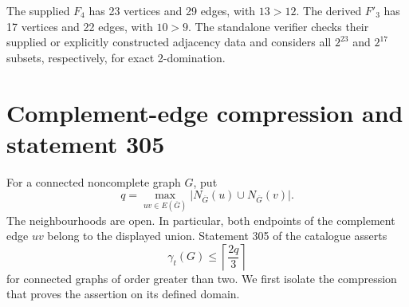 \documentclass[11pt,a4paper]{article}
\theoremstyle{remark}
\begin{document}
The supplied $F_4$ has 23 vertices and 29 edges, with $13>12$.
The derived $F'_3$ has 17 vertices and 22 edges, with $10>9$.
The standalone verifier checks their supplied or explicitly constructed
adjacency data and considers all $2^{23}$ and $2^{17}$ subsets,
respectively, for exact 2-domination.

\section{Complement-edge compression and statement 305}
\label{r5:sec305}

For a connected noncomplete graph \(G\), put
\[
q=\max_{uv\in E(\overline G)}
   \bigl|N_{\overline G}(u)\cup N_{\overline G}(v)\bigr|.
\]
The neighbourhoods are open. In particular, both endpoints of the
complement edge \(uv\) belong to the displayed union. Statement 305
of the catalogue \cite{WOWII} asserts
\begin{equation}\label{r5:eq305}
\gamma_t(G)\le \left\lceil\frac{2q}{3}\right\rceil
\end{equation}
for connected graphs of order greater than two. We first isolate the
compression that proves the assertion on its defined domain.
\end{document}
